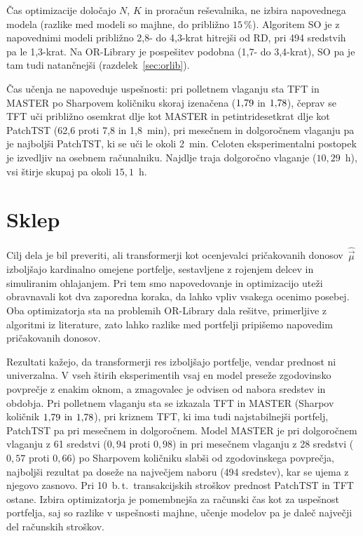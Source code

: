 \documentclass[9pt]{style/friteza}
\begin{document}
Čas optimizacije določajo $N$, $K$ in proračun reševalnika, ne izbira napovednega modela (razlike med modeli so majhne, do približno $15\,\%$). Algoritem SO je z napovednimi modeli približno 2,8- do 4,3-krat hitrejši od RD, pri 494 sredstvih pa le 1,3-krat. Na OR-Library je pospešitev podobna (1,7- do 3,4-krat), SO pa je tam tudi natančnejši (razdelek~\ref{sec:orlib}).

Čas učenja ne napoveduje uspešnosti: pri polletnem vlaganju sta TFT in MASTER po Sharpovem količniku skoraj izenačena ($1{,}79$ in $1{,}78$), čeprav se TFT uči približno osemkrat dlje kot MASTER in petintridesetkrat dlje kot PatchTST (62,6 proti 7,8 in 1,8~min), pri mesečnem in dolgoročnem vlaganju pa je najboljši PatchTST, ki se uči le okoli 2~min. Celoten eksperimentalni postopek je izvedljiv na osebnem računalniku. Najdlje traja dolgoročno vlaganje ($10{,}29$~h), vsi štirje skupaj pa okoli $15{,}1$~h. 

\section{Sklep}\label{sec:sklep}

Cilj dela je bil preveriti, ali transformerji kot ocenjevalci pričakovanih donosov~$\hat{\vec{\mu}}$ izboljšajo kardinalno omejene portfelje, sestavljene z rojenjem delcev in simuliranim ohlajanjem. Pri tem smo napovedovanje in optimizacijo uteži obravnavali kot dva zaporedna koraka, da lahko vpliv vsakega ocenimo posebej. Oba optimizatorja sta na problemih OR-Library dala rešitve, primerljive z algoritmi iz literature, zato lahko razlike med portfelji pripišemo napovedim pričakovanih donosov.

Rezultati kažejo, da transformerji res izboljšajo portfelje, vendar prednost ni univerzalna. V vseh štirih eksperimentih vsaj en model preseže zgodovinsko povprečje z enakim oknom, a zmagovalec je odvisen od nabora sredstev in obdobja. Pri polletnem vlaganju sta se izkazala TFT in MASTER (Sharpov količnik $1{,}79$ in $1{,}78$), pri kriznem TFT, ki ima tudi najstabilnejši portfelj, PatchTST pa pri mesečnem in dolgoročnem. Model MASTER je pri dolgoročnem vlaganju z 61 sredstvi ($0{,}94$ proti $0{,}98$) in pri mesečnem vlaganju z 28 sredstvi ($0{,}57$ proti $0{,}66$) po Sharpovem količniku slabši od zgodovinskega povprečja, najboljši rezultat pa doseže na največjem naboru (494 sredstev), kar se ujema z njegovo zasnovo. Pri 10~b.\,t.\ transakcijskih stroškov prednost PatchTST in TFT ostane. Izbira optimizatorja je pomembnejša za računski čas kot za uspešnost portfelja, saj so razlike v uspešnosti majhne, učenje modelov pa je daleč največji del računskih stroškov. 
\end{document}
